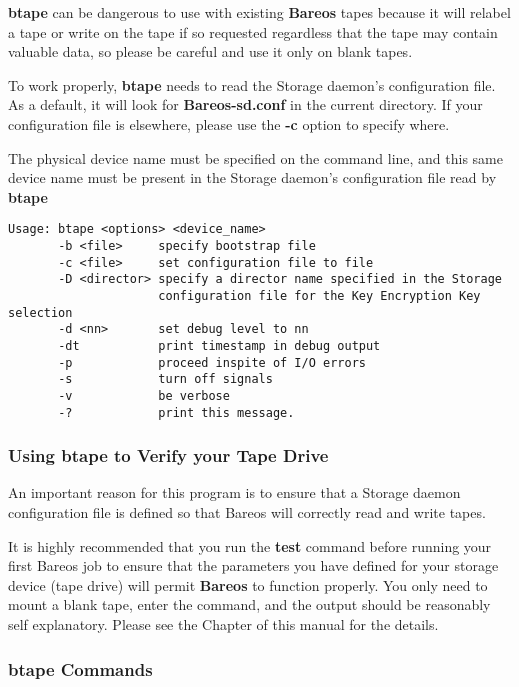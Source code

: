 {\bf btape} can be dangerous to use with existing {\bf Bareos} tapes because
it will relabel a tape or write on the tape if so requested regardless that
the tape may contain valuable data, so please be careful and use it only on
blank tapes.

To work properly, {\bf btape} needs to read the Storage daemon's configuration
file. As a default, it will look for {\bf Bareos-sd.conf} in the current
directory. If your configuration file is elsewhere, please use the {\bf -c}
option to specify where.

The physical device name must be specified on the command line, and this
same device name must be present in the Storage daemon's configuration file
read by {\bf btape}

\footnotesize
\begin{verbatim}
Usage: btape <options> <device_name>
       -b <file>     specify bootstrap file
       -c <file>     set configuration file to file
       -D <director> specify a director name specified in the Storage
                     configuration file for the Key Encryption Key selection
       -d <nn>       set debug level to nn
       -dt           print timestamp in debug output
       -p            proceed inspite of I/O errors
       -s            turn off signals
       -v            be verbose
       -?            print this message.
\end{verbatim}
\normalsize

\subsubsection{Using btape to Verify your Tape Drive}

An important reason for this program is to ensure that a Storage daemon
configuration file is defined so that Bareos will correctly read and write
tapes.

It is highly recommended that you run the {\bf test} command before running
your first Bareos job to ensure that the parameters you have defined for your
storage device (tape drive) will permit {\bf Bareos} to function properly. You
only need to mount a blank tape, enter the command, and the output should be
reasonably self explanatory. Please see the
 Chapter of this manual for
the details.

\subsubsection{btape Commands}

